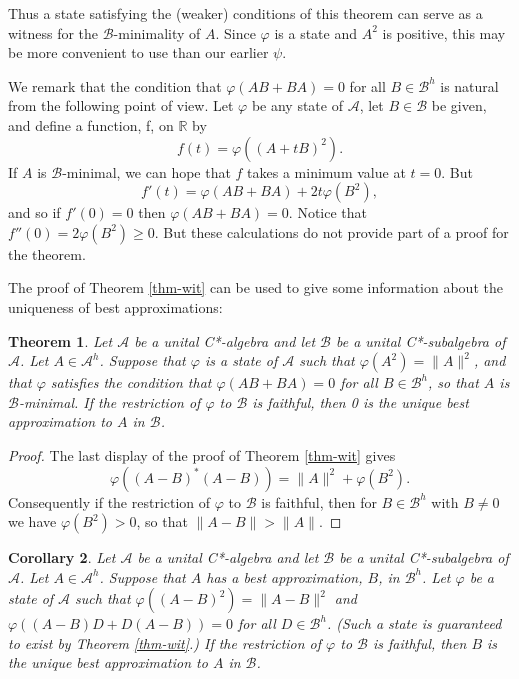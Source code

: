 \documentclass[12pt]{amsart}
\newcommand{\<}{\langle}
\renewcommand{\>}{\rangle}
\newcommand{\var}{\varphi}
\newcommand{\cA}{{\mathcal A}}
\newcommand{\cB}{{\mathcal B}}
\newcommand{\cAH}{{\mathcal A}^h}
\newcommand{\cBH}{{\mathcal B}^h}
\newcommand{\bR}{{\mathbb R}}
\newtheorem{theorem}{Theorem}[section]
\newtheorem{corollary}[theorem]{Corollary}
\theoremstyle{definition}   %
\begin{document}
Thus a state satisfying the (weaker) conditions of this theorem can
serve as a witness for the $\cB$-minimality of $A$. Since $\var$ is a state
and $A^2$ is positive, this may be more convenient to use than
our earlier $\psi$.

We remark that the condition that $\var(AB +BA) = 0$ 
for all $B \in \cBH$ is natural from the following point of view. Let
$\var$ be any state of $\cA$, let
$B \in \cB$ be given, and define a function, f, on $\bR$ by
\[
f(t) = \var((A+tB)^2)   .
\]
If $A$ is $\cB$-minimal, we can hope that $f$ takes a minimum value
at $t = 0$. But 
\[
f'(t) = \var(AB + BA) + 2t\var(B^2)   ,
\]
and so if $f'(0) = 0$ then $\var(AB+BA)=0$. Notice that 
$f''(0) = 2\var(B^2) \geq 0$. But these calculations do not
provide part of a proof for the theorem.

The proof of Theorem \ref{thm-wit} can be used to give some
information about the uniqueness of best approximations:

\begin{theorem}
\label{thm-uniq}
Let $\cA$ be a unital C*-algebra and let $\cB$ be a unital C*-subalgebra
of $\cA$. Let $A \in \cAH$. Suppose that $\var$ is a state of $\cA$ 
such that  $\var(A^2) = \|A\|^2$, and that
$\var$ satisfies the condition that $\var(AB +BA) = 0$ 
for all $B \in \cBH$, so that $A$ is $\cB$-minimal.
If the restriction of $\var$ to $\cB$ is faithful, then
0 is the unique best approximation to $A$ in $\cB$.
\end{theorem}

\begin{proof}
The last display of the proof of Theorem \ref{thm-wit} gives
\[
\var((A-B)^*(A-B)) = \|A\|^2 + \var(B^2)  .
\]
Consequently if the restriction of $\var$ to $\cB$ is faithful, 
then for $B \in \cBH$ with $B \neq 0$ we have $\var(B^2) > 0$,
so that $\|A-B\| > \|A\|$.
\end{proof}

\begin{corollary}
\label{corbest}
Let $\cA$ be a unital C*-algebra and let $\cB$ be a unital C*-subalgebra
of $\cA$. Let $A \in \cAH$. Suppose that $A$ has a best
approximation, $B$, in $\cBH$. Let $\var$ be a state of $\cA$ 
such that  $\var((A-B)^2) = \|A-B\|^2$ and
$\var((A-B)D +D(A-B)) = 0$ 
for all $D \in \cBH$. (Such a state is guaranteed 
to exist by Theorem \ref{thm-wit}.)
If the restriction of $\var$ to $\cB$ is faithful, then
$B$ is the unique best approximation to $A$ in $\cB$.
\end{corollary}
\end{document}
